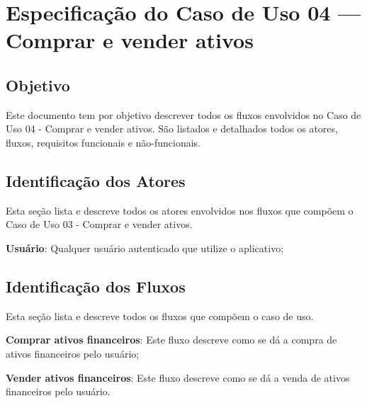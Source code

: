 
\section*{Especificação do Caso de Uso 04 --- Comprar e vender ativos}
\subsection*{Objetivo}
Este documento tem por objetivo descrever todos os fluxos envolvidos no Caso de Uso 04 - Comprar e vender ativos. São listados e detalhados todos os atores, fluxos, requisitos funcionais e não-funcionais.

\subsection*{Identificação dos Atores}
Esta seção lista e descreve todos os atores envolvidos nos fluxos que compõem o Caso de Uso 03 - Comprar e vender ativos.
\begin{lista}
  \item \textbf{Usuário}: Qualquer usuário autenticado que utilize o aplicativo;
\end{lista}

\subsection*{Identificação dos Fluxos}
Esta seção lista e descreve todos os fluxos que compõem o caso de uso.
\begin{lista}
  \item \textbf{Comprar ativos financeiros}: Este fluxo descreve como se dá a compra de ativos financeiros pelo usuário;
  \item \textbf{Vender ativos financeiros}: Este fluxo descreve como se dá a venda de ativos financeiros pelo usuário.
\end{lista}

